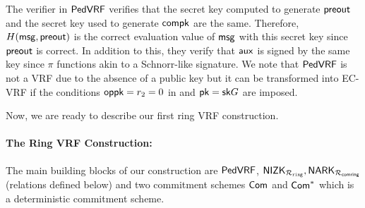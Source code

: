 %



The verifier in $ {\mathsf{PedVRF}} $ verifies that the secret key computed to generate $ {\mathsf{preout}} $ and the secret key used to generate $ \mathsf{compk} $ are the same. Therefore, $ H(\mathsf{msg}, {\mathsf{preout}}) $ is the correct evaluation value of $ \mathsf{msg} $ with this secret key since $ {\mathsf{preout}} $ is correct. In addition to this, they verify that $ \mathsf{aux} $
is signed by the same key since $ \pi $ functions akin to a  Schnorr-like signature. We note that $ {\mathsf{PedVRF}} $ is not a VRF due to the absence of a public key but it can be transformed into EC-VRF \cite{nsec5,VXEd25519,draft-irtf-cfrg-vrf-10} if the conditions $\mathsf{oppk} = r_2 = 0$ in \Sign and $ \mathsf{pk} = \mathsf{sk} G $ are imposed.

Now, we are ready to describe our first ring VRF construction.
\paragraph{The Ring VRF Construction:} The main building blocks of our construction are $ {\mathsf{PedVRF}} $, $ {\mathsf{NIZK}}_{\mathcal{R}_{\mathtt{ring}}}, \mathsf{NARK}_{\mathcal{R}_{\mathsf{comring}}} $ (relations defined below) and two commitment schemes $ \mathsf{Com} $ and $ \mathsf{Com}^* $ which is a deterministic commitment scheme. 

